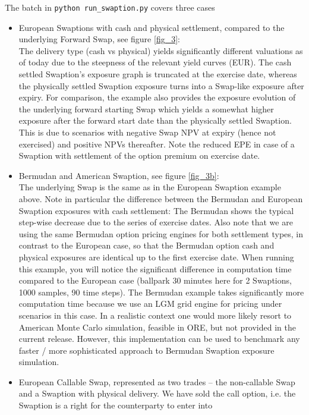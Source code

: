 The batch in {\tt python run\_swaption.py} covers three cases
\begin{itemize}
\item European Swaptions with cash and physical settlement, compared to the underlying Forward Swap, see figure \ref{fig_3}:\\
  The delivery type (cash vs physical) yields significantly different valuations as of today due to the steepness of the
  relevant yield curves (EUR). The cash settled Swaption's exposure graph is truncated at the exercise date, whereas the
  physically settled Swaption exposure turns into a Swap-like exposure after expiry. For comparison, the example also
  provides the exposure evolution of the underlying forward starting Swap which yields a somewhat higher exposure after
  the forward start date than the physically settled Swaption. This is due to scenarios with negative Swap NPV at expiry
  (hence not exercised) and positive NPVs thereafter. Note the reduced EPE in case of a Swaption with settlement of the
  option premium on exercise date.
\item Bermudan and American Swaption, see figure \ref{fig_3b}: \\
  The underlying Swap is the same as in the European Swaption example above. Note in
  particular the difference between the Bermudan and European Swaption exposures with cash settlement: The Bermudan shows
  the typical step-wise decrease due to the series of exercise dates. Also note that we are using the same Bermudan option
  pricing engines for both settlement types, in contrast to the European case, so that the Bermudan option cash and
  physical exposures are identical up to the first exercise date. When running this example, you will notice the
  significant difference in computation time compared to the European case (ballpark 30 minutes here for 2 Swaptions, 1000
  samples, 90 time steps). The Bermudan example takes significantly more computation time because we use an LGM grid
  engine for pricing under scenarios in this case. In a realistic context one would more likely resort to American Monte
  Carlo simulation, feasible in ORE, but not provided in the current release. However, this implementation can be used to
  benchmark any faster / more sophisticated approach to Bermudan Swaption exposure simulation.
\item European Callable Swap, represented as two trades -- the non-callable Swap and a Swaption
  with physical delivery. We have sold the call option, i.e. the Swaption is a right for the counterparty to enter into

\end{itemize}
